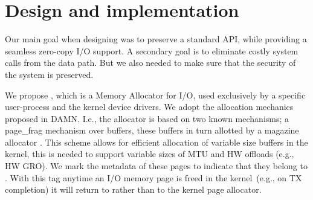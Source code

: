 
\section{Design and implementation}\label{sec:design}
Our main goal when designing \oursys was to preserve a standard \sockets API, while providing a seamless zero-copy I/O support. A secondary goal is to eliminate costly system calls from the data path. But we also needed to make sure that the security of the system is preserved.



We propose \oursys, which is a Memory Allocator for I/O, used exclusively by a specific user-process and the kernel device drivers. %
We adopt the allocation mechanics proposed in DAMN\cite{markuze2018damn}. I.e., the allocator is based on two known mechanisms; a page\_frag mechanism \cite{pagefrag} over \size buffers, these buffers in turn allotted by a magazine allocator \cite{bonwick2001magazines}. This scheme allows for efficient allocation of variable size buffers in the kernel, this is needed to support variable sizes of MTU and HW offloads (e.g., HW GRO). We mark the metadata of these \oursys pages to indicate that they belong to \oursys. With this tag anytime an I/O  memory page is freed in the kernel~(e.g., on TX completion) it will return to \oursys rather than to the kernel page allocator. 


